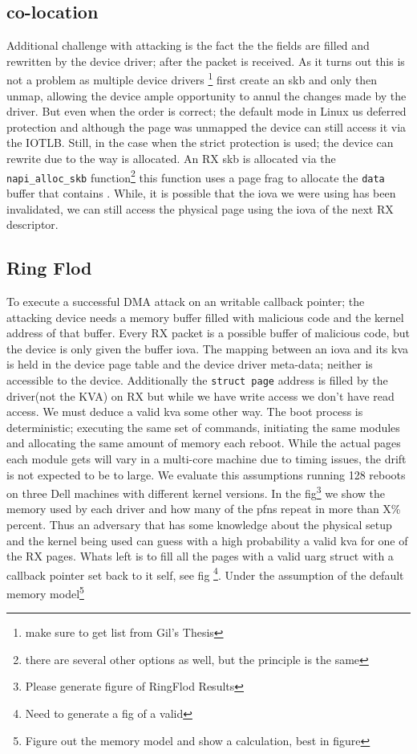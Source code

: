 \subsection{\shinfo co-location}
Additional challenge with attacking \shinfo is the fact the the fields are filled and rewritten by the device driver; after the packet is received. As it turns out this is not a problem as multiple device drivers \footnote{make sure to get list from Gil's Thesis} first create an skb and only then unmap, allowing the device ample opportunity to annul the changes made by the driver. But even when the order is correct; the default mode in Linux us deferred protection and although the page was unmapped the device can still access it via the IOTLB. Still, in the case when the strict protection is used; the device can rewrite \shinfo due to the way \shinfo is allocated. An RX skb is allocated via the \texttt{napi\_alloc\_skb} function\footnote{there are several other options as well, but the principle is the same} this function uses a page frag to allocate the \texttt{data} buffer that contains \shinfo. While, it is possible that the iova we were using has been invalidated, we can still access the physical page using the iova of the next RX descriptor.

\subsection{Ring Flod}
To execute a successful DMA attack on an writable callback pointer; the attacking device needs a memory buffer filled with malicious code and the kernel address of that buffer.
Every RX packet is a possible buffer of malicious code, but the device is only given the buffer iova. The mapping between an iova and its kva is held in the device page table and the device driver meta-data; neither is accessible to the device. Additionally the \texttt{struct page} address is filled by the driver(not the KVA) on RX but while we have write access we don't have read access. We must deduce a valid kva some other way.\newline
The boot process is deterministic; executing the same set of commands, initiating the same modules and allocating the same amount of memory each reboot. While the actual pages each module gets will vary in a multi-core machine due to timing issues, the drift is not expected to be to large. We evaluate this assumptions running 128 reboots on three Dell machines with different kernel versions. In the fig\footnote{Please generate figure of RingFlod Results} we show the memory used by each driver and how many of the pfns repeat in more than X\% percent. Thus an adversary that has some knowledge about the physical setup and the kernel being used can guess with a high probability a valid kva for one of the RX pages. Whats left is to fill all the pages with a valid uarg struct with a callback pointer set back to it self, see fig \footnote{Need to generate a fig of a valid \uarg}. Under the assumption of the default memory model\footnote{Figure out the memory model and show a calculation, best in figure}

